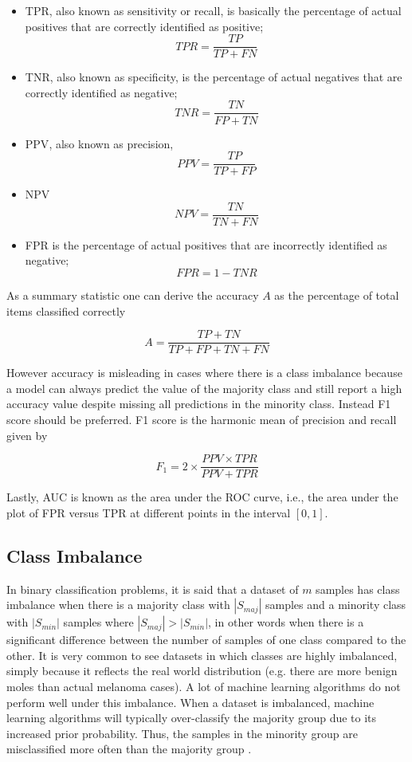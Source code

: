 \begin{itemize}
    \item \ac{TPR}, also known as sensitivity or recall, is basically the percentage of actual positives that are correctly identified as positive;
        $$TPR = \frac{TP}{TP + FN}$$
    \item \ac{TNR}, also known as specificity, is the percentage of actual negatives that are correctly identified as negative;
        $$TNR = \frac{TN}{FP + TN}$$
    \item \ac{PPV}, also known as precision,
        $$PPV = \frac{TP}{TP + FP}$$
    \item \ac{NPV}
        $$NPV = \frac{TN}{TN + FN}$$
    \item \ac{FPR} is the percentage of actual positives that are incorrectly identified as negative;
        $$FPR = 1 - TNR$$
\end{itemize}

As a summary statistic one can derive the accuracy $A$ as the percentage of total items classified correctly

$$
A = \frac{TP + TN}{TP + FP + TN + FN}
$$

However accuracy is misleading in cases where there is a class imbalance because a model can always predict the value of the majority class and still report a high accuracy value despite missing all predictions in the minority class. Instead F1 score should be preferred. F1 score is the harmonic mean of precision and recall given by

$$
F_1 = 2 \times \frac{PPV \times TPR}{PPV + TPR}
$$

Lastly, \ac{AUC} is known as the area under the \ac{ROC} curve, i.e., the area under the plot of \ac{FPR} versus \ac{TPR} at different points in the interval $[0, 1]$.

\subsection{Class Imbalance}

In binary classification problems, it is said that a dataset of $m$ samples has class imbalance when there is a majority class with $|S_{maj}|$ samples and a minority class with $|S_{min}|$ samples where $|S_{maj}| > |S_{min}|$, in other words when there is a significant difference between the number of samples of one class compared to the other. It is very common to see datasets in which classes are highly imbalanced, simply because it reflects the real world distribution (e.g. there are more benign moles than actual melanoma cases). A lot of machine learning algorithms do not perform well under this imbalance. When a dataset is imbalanced, machine learning algorithms will typically over-classify the majority group due to its increased prior probability. Thus, the samples in the minority group are misclassified more often than the majority group \cite{Johnson2019}.

